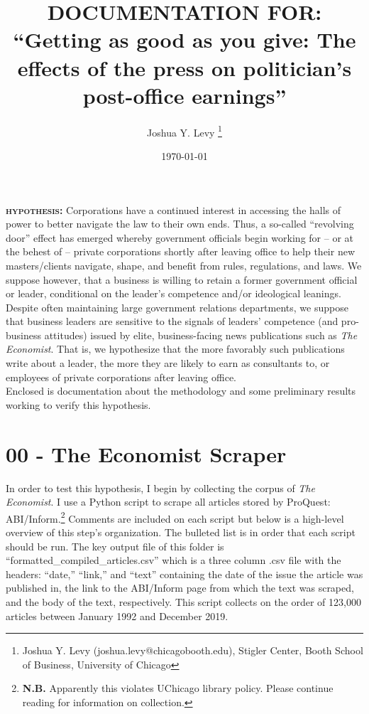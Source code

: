 \documentclass[11pt, letterpaper, twoside]{article}
\title{\singlespacing\textbf{DOCUMENTATION FOR: ``Getting as good as you give: The effects of the press on politician's post-office earnings''}}
\author{Joshua Y. Levy \thanks{Joshua Y. Levy  (joshua.levy@chicagobooth.edu), Stigler Center, Booth School of Business, University of Chicago}}
\date{\today}
\begin{document}
\begin{titlepage}
    \maketitle
    \thispagestyle{empty}
\end{titlepage}


\newpage
{}

\textsc{\textbf{hypothesis: }}Corporations have a continued interest in accessing the halls of power to better navigate the law to their own ends. Thus, a so-called ``revolving door'' effect has emerged whereby government officials begin working for -- or at the behest of -- private corporations shortly after leaving office to help their new masters/clients navigate, shape, and benefit from rules, regulations, and laws. We suppose however, that a business is willing to retain a former government official or leader, conditional on the leader's competence and/or ideological leanings. Despite often maintaining large government relations departments, we suppose that business leaders are sensitive to the signals of leaders' competence (and pro-business attitudes) issued by elite, business-facing news publications such as \textit{The Economist}. That is, we hypothesize that the more favorably such publications write about a leader, the more they are likely to earn as consultants to, or employees of private corporations after leaving office.\\

Enclosed is documentation about the methodology and some preliminary results working to verify this hypothesis.

\section{00 - The Economist Scraper}

In order to test this hypothesis, I begin by collecting the corpus of \textit{The Economist}. I use a Python script to scrape all articles stored by ProQuest: ABI/Inform.\footnote{\textbf{N.B.} Apparently this violates UChicago library policy. Please continue reading for information on collection.} Comments are included on each script but below is a high-level overview of this step's organization. The bulleted list is in order that each script should be run. The key output file of this folder is ``formatted\_compiled\_articles.csv'' which is a three column .csv file with the headers: ``date,'' ``link,'' and ``text'' containing the date of the issue the article was published in, the link to the ABI/Inform page from which the text was scraped, and the body of the text, respectively. This script collects on the order of 123,000 articles between January 1992 and December 2019.
\end{document}
